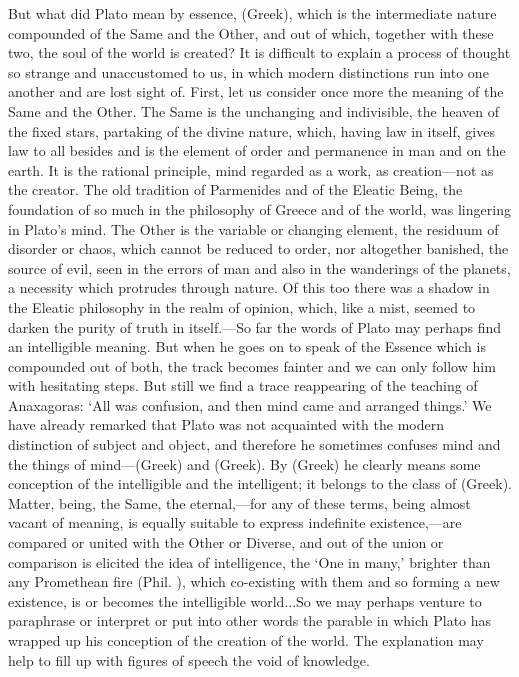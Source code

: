\documentclass[11pt,letter]{article}
\begin{document}
\par  But what did Plato mean by essence, (Greek), which is the intermediate nature compounded of the Same and the Other, and out of which, together with these two, the soul of the world is created? It is difficult to explain a process of thought so strange and unaccustomed to us, in which modern distinctions run into one another and are lost sight of. First, let us consider once more the meaning of the Same and the Other. The Same is the unchanging and indivisible, the heaven of the fixed stars, partaking of the divine nature, which, having law in itself, gives law to all besides and is the element of order and permanence in man and on the earth. It is the rational principle, mind regarded as a work, as creation—not as the creator. The old tradition of Parmenides and of the Eleatic Being, the foundation of so much in the philosophy of Greece and of the world, was lingering in Plato’s mind. The Other is the variable or changing element, the residuum of disorder or chaos, which cannot be reduced to order, nor altogether banished, the source of evil, seen in the errors of man and also in the wanderings of the planets, a necessity which protrudes through nature. Of this too there was a shadow in the Eleatic philosophy in the realm of opinion, which, like a mist, seemed to darken the purity of truth in itself.—So far the words of Plato may perhaps find an intelligible meaning. But when he goes on to speak of the Essence which is compounded out of both, the track becomes fainter and we can only follow him with hesitating steps. But still we find a trace reappearing of the teaching of Anaxagoras: ‘All was confusion, and then mind came and arranged things.’ We have already remarked that Plato was not acquainted with the modern distinction of subject and object, and therefore he sometimes confuses mind and the things of mind—(Greek) and (Greek). By (Greek) he clearly means some conception of the intelligible and the intelligent; it belongs to the class of (Greek). Matter, being, the Same, the eternal,—for any of these terms, being almost vacant of meaning, is equally suitable to express indefinite existence,—are compared or united with the Other or Diverse, and out of the union or comparison is elicited the idea of intelligence, the ‘One in many,’ brighter than any Promethean fire (Phil. ), which co-existing with them and so forming a new existence, is or becomes the intelligible world...So we may perhaps venture to paraphrase or interpret or put into other words the parable in which Plato has wrapped up his conception of the creation of the world. The explanation may help to fill up with figures of speech the void of knowledge.
\end{document}
